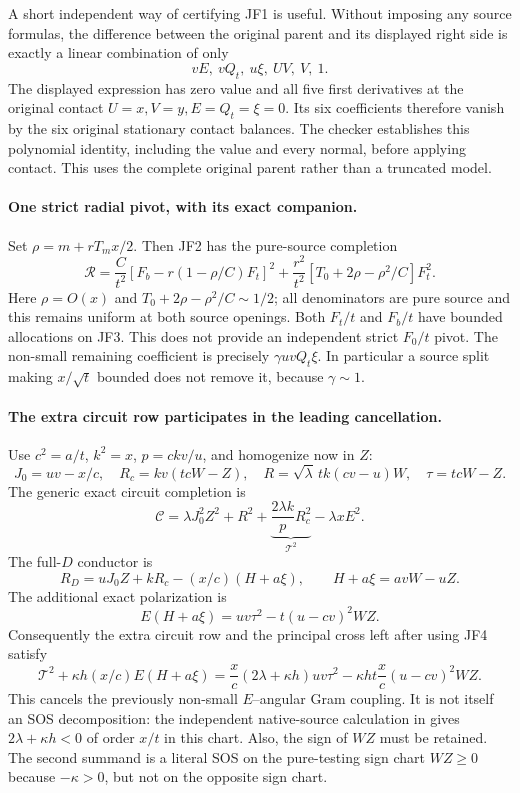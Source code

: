 A short independent way of certifying JF1 is useful. Without imposing
any source formulas, the difference between the original parent and
its displayed right side is exactly a linear combination of only
\[
                       vE,\ vQ_t,\ u\xi,\ UV,\ V,\ 1.
\]
The displayed expression has zero value and all five first derivatives
at the original contact $U=x,V=y,E=Q_t=\xi=0$.
Its six coefficients therefore vanish by the six original stationary
contact balances. The checker establishes this polynomial identity,
including the value and every normal, before applying contact. This
uses the complete original parent rather than a truncated model.

\paragraph{One strict radial pivot, with its exact companion.}
Set $\rho=m+rT_mx/2$. Then JF2 has the pure-source completion
\[
 \mathscr R=\frac C{t^2}
       [F_b-r(1-\rho/C)F_t]^2
       +\frac{r^2}{t^2}[T_0+2\rho-\rho^2/C]F_t^2.  \tag{JF3}
\]
Here $\rho=O(x)$ and $T_0+2\rho-\rho^2/C\sim1/2$;
all denominators are pure source and this remains uniform at both
source openings. Both $F_t/t$ and $F_b/t$ have bounded allocations
on JF3. This does not provide an independent strict $F_0/t$ pivot.
The non-small remaining coefficient is precisely $\gamma uvQ_t\xi$.
In particular a source split making $x/\sqrt t$ bounded does not
remove it, because $\gamma\sim1$.

\paragraph{The extra circuit row participates in the leading cancellation.}
Use $c^2=a/t$, $k^2=x$, $p=ckv/u$, and homogenize now in $Z$:
\[
 J_0=uv-x/c,\quad R_c=kv(tcW-Z),\quad
 R=\sqrt\lambda\,tk(cv-u)W,
 \quad \tau=tcW-Z.
\]
The generic exact circuit completion is
\[
 \mathscr C=\lambda J_0^2Z^2+R^2+
      \underbrace{\frac{2\lambda k}{p}R_c^2}_{\mathcal T^2}
      -\lambda xE^2.
\]
The full-$D$ conductor is
\[
 R_D=uJ_0Z+kR_c-(x/c)(H+a\xi),\qquad
 H+a\xi=avW-uZ.                                  \tag{JF4}
\]
The additional exact polarization is
\[
 E(H+a\xi)=uv\tau^2-t(u-cv)^2WZ.                  \tag{JF5}
\]
Consequently the extra circuit row and the principal cross left after
using JF4 satisfy
\[
 \mathcal T^2+\kappa h(x/c)E(H+a\xi)
 =\frac{x}{c}(2\lambda+\kappa h)uv\tau^2
      -\kappa ht\frac{x}{c}(u-cv)^2WZ.             \tag{JF6}
\]
This cancels the previously non-small $E$--angular Gram coupling.
It is not itself an SOS decomposition: the independent native-source
calculation in 
gives $2\lambda+\kappa h<0$ of order $x/t$ in this chart.
Also, the sign of $WZ$ must be retained. The second summand is a
literal SOS on the pure-testing sign chart $WZ\ge0$ because
$-\kappa>0$, but not on the opposite sign chart.

